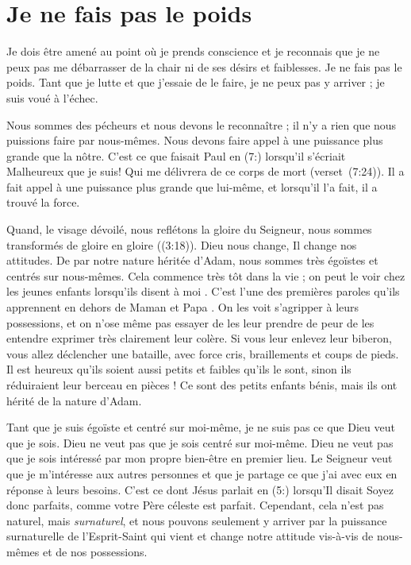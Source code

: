 \section{Je ne fais pas le poids}

Je dois être amené au point où je prends conscience et
 je reconnais que je ne peux pas me débarrasser de la chair
 ni de ses désirs et faiblesses.
 Je ne fais pas le poids. Tant que je lutte et que j'essaie de le faire,
 je ne peux pas y arriver ; je suis voué à l'échec.

Nous sommes des pécheurs et nous devons le reconnaître ;
 il n'y a rien que nous puissions faire par nous-mêmes.
 Nous devons faire appel à une puissance plus grande que la nôtre.
 C'est ce que faisait Paul en (7:) lorsqu'il s'écriait\frcolon{}
 \Og Malheureux que je suis! Qui me délivrera de ce corps de mort \Fg{}
 (verset~(7:24)).
 Il a fait appel à une puissance plus grande que lui-même,
 et lorsqu'il l'a fait, il a trouvé la force.

\Og Quand, le visage dévoilé, nous reflétons la gloire du Seigneur,
nous sommes transformés de gloire en gloire \Fg{} ((3:18)).
 Dieu nous change, Il change nos attitudes.
 De par notre nature héritée d'Adam, nous sommes très égoïstes
 et centrés sur nous-mêmes.
 Cela commence très tôt dans la vie ; on peut le voir chez les jeunes enfants
 lorsqu'ils disent \Og à moi \Fg{}.
 C'est l'une des premières paroles qu'ils apprennent
 en dehors de \Og Maman \Fg{} et \Og Papa \Fg{}.
 On les voit s'agripper à leurs possessions, et on n'ose même pas
 essayer de les leur prendre de peur de les entendre exprimer très clairement leur colère.
 Si vous leur enlevez leur biberon, vous allez déclencher une bataille,
 avec force cris, braillements et coups de pieds.
 Il est heureux qu'ils soient aussi petits et faibles qu'ils le sont,
 sinon ils réduiraient leur berceau en pièces !
 Ce sont des petits enfants bénis,
 mais ils ont hérité de la nature d'Adam.

Tant que je suis égoïste et centré sur moi-même,
 je ne suis pas ce que Dieu veut que je sois.
 Dieu ne veut pas que je sois centré sur moi-même.
 Dieu ne veut pas que je sois intéressé par mon propre bien-être
 en premier lieu.
 Le Seigneur veut que je m'intéresse aux autres personnes et que
 je partage ce que j'ai avec eux en réponse à leurs besoins.
 C'est ce dont Jésus parlait en (5:) lorsqu'Il disait\frcolon{}
 \Og Soyez donc parfaits, comme votre Père céleste est parfait. \Fg{}
 Cependant, cela n'est pas naturel, mais \emph{surnaturel},
 et nous pouvons seulement
 y arriver par la puissance surnaturelle de l'Esprit-Saint
 qui vient et change notre attitude vis-à-vis de nous-mêmes
 et de nos possessions.

